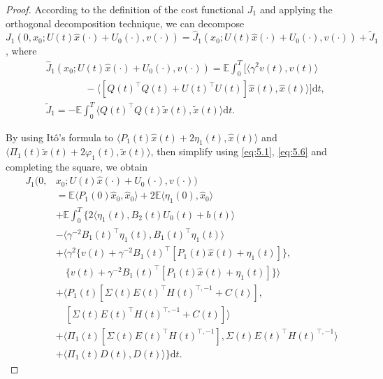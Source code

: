 \documentclass[lettersize,journal]{IEEEtran}
\theoremstyle{plain}
\theoremstyle{definition}
\begin{document}
\begin{proof}
	According to the definition of the cost functional $J_1$ and applying the orthogonal decomposition technique, we can decompose $J_1(0,x_0;U(t)\widehat{x}(\cdot) + U_0(\cdot),v(\cdot)) = \widehat{J}_1(x_0;U(t)\widehat{x}(\cdot) + U_0(\cdot),v(\cdot)) + \widetilde{J}_1$, where
	\begin{equation*}
		\begin{aligned}
			&\widehat{J}_1(x_0;U(t)\widehat{x}(\cdot) + U_0(\cdot),v(\cdot)) = \mathbb{E}\int_0^T \Big[\langle\gamma^2v(t),v(t)\rangle \\
			&\qquad \qquad- \langle[Q(t)^{\top}Q(t) + U(t)^{\top}U(t)]\widehat{x}(t),\widehat{x}(t)\rangle\Big]\mathrm{d}t,\\
			&\widetilde{J}_1 = -\mathbb{E}\int_0^T \langle Q(t)^{\top}Q(t)\widetilde{x}(t),\widetilde{x}(t)\rangle \mathrm{d}t.
		\end{aligned}
	\end{equation*}
	
	By using It\^{o}'s formula to $\langle P_1(t)\widehat{x}(t) + 2\eta_1(t),\widehat{x}(t)\rangle$ and $\langle \Pi_1(t)\widetilde{x}(t) + 2\varphi_1(t),\widetilde{x}(t)\rangle$, then simplify using \eqref{eq:5.1}, \eqref{eq:5.6} and completing the square, we obtain
	\begin{equation}\label{eq:5.15}
		\begin{aligned}
			J_1(0,&x_0;U(t)\widehat{x}(\cdot) + U_0(\cdot),v(\cdot)) \\
			&= \mathbb{E} \langle P_1(0)\widehat{x}_0,\widehat{x}_0 \rangle + 2\mathbb{E} \langle \eta_1(0),\widehat{x}_0 \rangle\\
			&+ \mathbb{E} \int_0^T \Big\{ 2\langle \eta_1(t), B_2(t)U_0(t) + b(t) \rangle \\
			& - \langle \gamma^{-2} B_1(t)^\top \eta_1(t),B_1(t)^\top \eta_1(t) \rangle\\
			& + \langle \gamma^2\{v(t) + \gamma^{-2}B_1(t)^{\top}[P_1(t)\widehat{x}(t) + \eta_1(t)]\},\\
			&\quad\{v(t) + \gamma^{-2}B_1(t)^{\top}[P_1(t)\widehat{x}(t) + \eta_1(t)]\} \rangle\\
			&+ \langle P_1(t)[\Sigma(t) E(t)^\top H(t)^{\top,-1} + C(t)],\\
			&\quad [\Sigma(t)E(t)^\top H(t)^{\top,-1} + C(t)] \rangle\\
			& + \langle \Pi_1(t)[\Sigma(t)E(t)^{\top}H(t)^{\top,-1}],\Sigma(t)E(t)^{\top}H(t)^{\top,-1} \rangle \\
			& + \langle \Pi_1(t)D(t),D(t) \rangle \Big\} \mathrm{d}t.
		\end{aligned}
	\end{equation}
	

\end{proof}
\end{document}
